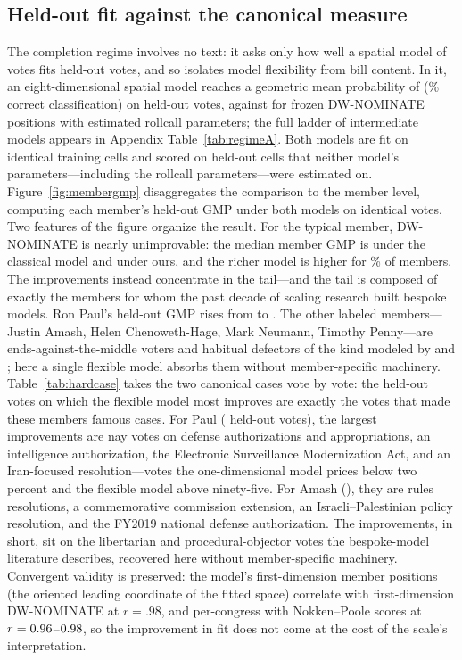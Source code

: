 \documentclass[12pt]{article}
\begin{document}
\subsection{Held-out fit against the canonical measure}

The completion regime involves no text: it asks only how well a
spatial model of votes fits held-out votes, and so isolates model
flexibility from bill content. In it, an eight-dimensional spatial
model reaches a geometric mean probability of \regimeAbestGMP{}
(\regimeAbestAcc\% correct classification) on held-out votes, against
\regimeAnominateGMP{} for frozen DW-NOMINATE positions with estimated
rollcall parameters; the full ladder of intermediate models appears
in Appendix Table~\ref{tab:regimeA}. Both models are fit on identical
training cells and scored on held-out cells that neither model's
parameters---including the rollcall parameters---were estimated on.
Figure~\ref{fig:membergmp} disaggregates the comparison to the member
level, computing each member's held-out GMP under both models on
identical votes. Two
features of the figure organize the result. For the typical member,
DW-NOMINATE is nearly unimprovable: the median member GMP is
\memberGMPmedNom{} under the classical model and \memberGMPmedOurs{}
under ours, and the richer model is higher for \memberGMPshare\% of
members. The improvements instead concentrate in the tail---and the
tail is composed of exactly the members for whom the past decade of
scaling research built bespoke models. Ron Paul's held-out GMP rises
from \paulGMPnom{} to \paulGMPours. The other labeled members---
Justin Amash, Helen Chenoweth-Hage, Mark Neumann, Timothy
Penny---are ends-against-the-middle voters and habitual defectors of
the kind modeled by \citet{duckmayr2023ends} and
\citet{fowler2026protest}; here a single flexible model absorbs them
without member-specific machinery. Table~\ref{tab:hardcase} takes the
two canonical cases vote by vote: the held-out votes on which the
flexible model most improves are exactly the votes that made these
members famous cases. For Paul (\paulHeldoutN{} held-out votes), the
largest improvements are nay votes on defense authorizations and
appropriations, an intelligence authorization, the Electronic
Surveillance Modernization Act, and an Iran-focused resolution---votes
the one-dimensional model prices below two percent and the flexible
model above ninety-five. For Amash (\amashHeldoutN{}), they are rules
resolutions, a commemorative commission extension, an
Israeli--Palestinian policy resolution, and the FY2019 national
defense authorization. The improvements, in short, sit on the
libertarian and procedural-objector votes the bespoke-model
literature describes, recovered here without member-specific
machinery. Convergent validity is preserved:
the model's first-dimension member positions (the oriented leading
coordinate of the fitted space) correlate with first-dimension
DW-NOMINATE at $r = .98$, and per-congress with Nokken--Poole scores
\citep{nokken2004congressional} at $r = 0.96$--$0.98$, so the
improvement in fit does not come at the cost of the scale's
interpretation.
\end{document}
